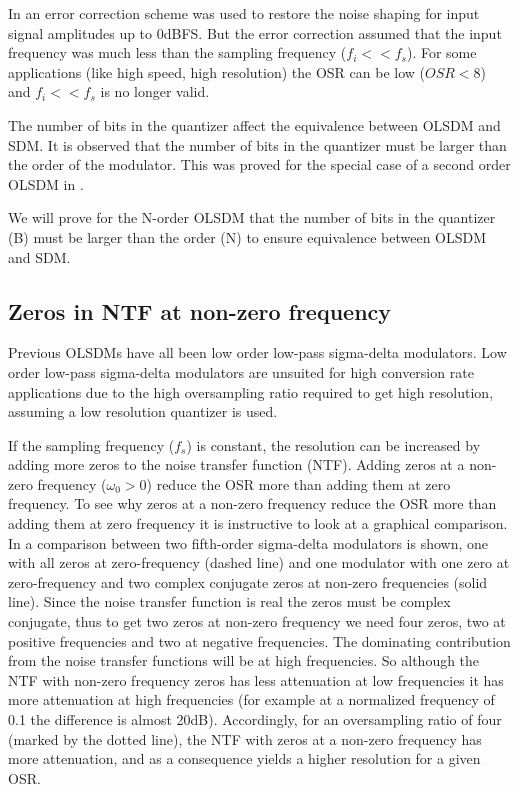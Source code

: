 In \cite{wulff08a} an error
correction scheme was used to restore the noise shaping for input
signal amplitudes up to 0dBFS. But the error correction assumed that
the input frequency was much less than the sampling frequency ($f_i << f_s$). For some applications (like high speed, high
resolution) the OSR can be low ($OSR < 8$) and $f_i << f_s$ is no
longer valid. 

The number of bits in the quantizer affect the equivalence
between OLSDM and SDM. It is observed that the number of bits in
the quantizer must be larger than the order of the modulator. This was
proved for the special case of a second order OLSDM in
\cite{wisland02a}.

We will prove for
the N-order OLSDM that the number of bits in the quantizer (B) must be
larger than the order (N) to ensure equivalence between OLSDM and SDM.

\subsection{Zeros in NTF at non-zero frequency}
Previous OLSDMs have all been low order low-pass sigma-delta
modulators. Low order low-pass sigma-delta modulators are unsuited for high
conversion rate applications due to the high oversampling ratio
required to get high resolution, assuming a low resolution quantizer
is used. 

If the sampling frequency ($f_s$) is constant, the resolution can be increased by
adding more zeros to the noise transfer function (NTF). Adding zeros at a non-zero
frequency ($\omega_0 > 0$) reduce the OSR more than adding them at
zero frequency. To see why zeros at a non-zero frequency reduce the
OSR more than adding them at zero frequency it is instructive to look at a
graphical comparison. In  a comparison between two
fifth-order sigma-delta modulators is shown, one with all zeros at
zero-frequency (dashed line) and one modulator with one zero at
zero-frequency and two complex conjugate zeros at non-zero frequencies
(solid line). Since the noise
transfer function is real the zeros must be complex conjugate, thus to
get two zeros at non-zero frequency we need four zeros, two at
positive frequencies and two at negative frequencies. The dominating
contribution from the noise transfer functions will be at high
frequencies. So although the NTF with non-zero frequency zeros has less
attenuation at low frequencies it has more attenuation at high
frequencies (for example at a normalized frequency of 0.1 the
difference is almost 20dB). Accordingly, for an oversampling ratio of
four (marked by the dotted line), the NTF with zeros at a non-zero
frequency has more attenuation, and as a consequence yields a higher
resolution for a given OSR.


